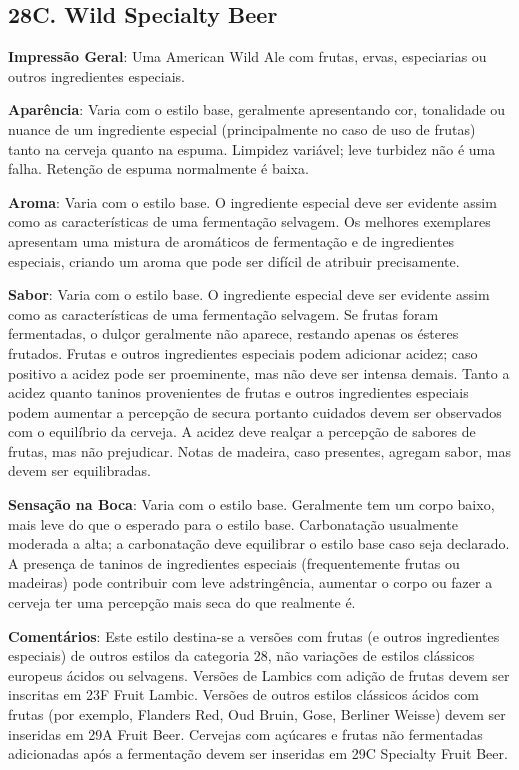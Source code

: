 \subsection*{28C. Wild Specialty Beer}
\textbf{Impressão Geral}: Uma American Wild Ale com frutas, ervas, especiarias ou outros ingredientes especiais.

\textbf{Aparência}: Varia com o estilo base, geralmente apresentando cor, tonalidade ou nuance de um ingrediente especial (principalmente no caso de uso de frutas) tanto na cerveja quanto na espuma. Limpidez variável; leve turbidez não é uma falha. Retenção de espuma normalmente é baixa.

\textbf{Aroma}: Varia com o estilo base. O ingrediente especial deve ser evidente assim como as características de uma fermentação selvagem. Os melhores exemplares apresentam uma mistura de aromáticos de fermentação e de ingredientes especiais, criando um aroma que pode ser difícil de atribuir precisamente.

\textbf{Sabor}: Varia com o estilo base. O ingrediente especial deve ser evidente assim como as características de uma fermentação selvagem. Se frutas foram fermentadas, o dulçor geralmente não aparece, restando apenas os ésteres frutados. Frutas e outros ingredientes especiais podem adicionar acidez; caso positivo a acidez pode ser proeminente, mas não deve ser intensa demais. Tanto a acidez quanto taninos provenientes de frutas e outros ingredientes especiais podem aumentar a percepção de secura portanto cuidados devem ser observados com o equilíbrio da cerveja. A acidez deve realçar a percepção de sabores de frutas, mas não prejudicar. Notas de madeira, caso presentes, agregam sabor, mas devem ser equilibradas.

\textbf{Sensação na Boca}: Varia com o estilo base. Geralmente tem um corpo baixo, mais leve do que o esperado para o estilo base. Carbonatação usualmente moderada a alta; a carbonatação deve equilibrar o estilo base caso seja declarado. A presença de taninos de ingredientes especiais (frequentemente frutas ou madeiras) pode contribuir com leve adstringência, aumentar o corpo ou fazer a cerveja ter uma percepção mais seca do que realmente é.

\textbf{Comentários}: Este estilo destina-se a versões com frutas (e outros ingredientes especiais) de outros estilos da categoria 28, não variações de estilos clássicos europeus ácidos ou selvagens. Versões de Lambics com adição de frutas devem ser inscritas em 23F Fruit Lambic. Versões de outros estilos clássicos ácidos com frutas (por exemplo, Flanders Red, Oud Bruin, Gose, Berliner Weisse) devem ser inseridas em 29A Fruit Beer. Cervejas com açúcares e frutas não fermentadas adicionadas após a fermentação devem ser inseridas em 29C Specialty Fruit Beer.

